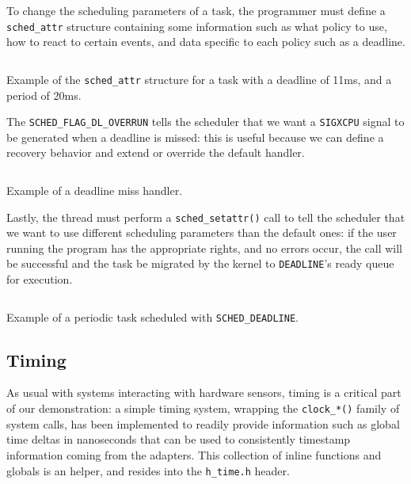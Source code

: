\documentclass[a4paper,12pt]{report}
\begin{document}
To change the scheduling parameters of a task, the programmer must define a \texttt{sched\_attr} structure containing some information such as what policy to use, how to react to certain events, and data specific to each policy such as a deadline.  

\begin{listing}[H]
\inputminted[frame=single,framesep=10pt]{c}{snippets/sched-attr.c}
\caption{Example of the \texttt{sched\_attr} structure for a task with a deadline of 11ms, and a period of 20ms.}
\end{listing}

The \texttt{SCHED\_FLAG\_DL\_OVERRUN} tells the scheduler that we want a \texttt{SIGXCPU} signal to be generated when a deadline is missed: this is useful because we can define a recovery behavior and extend or override the default handler.

\begin{listing}[H]
\inputminted[frame=single,framesep=10pt]{c}{snippets/dl-miss-handler.c}
\caption{Example of a deadline miss handler.}
\end{listing}

Lastly, the thread must perform a \texttt{sched\_setattr()} call to tell the scheduler that we want to use different scheduling parameters than the default ones: if the user running the program has the appropriate rights, and no errors occur, the call will be successful and the task be migrated by the kernel to \texttt{DEADLINE}'s ready queue for execution.

\begin{listing}[H]
\inputminted[frame=single,framesep=10pt]{c}{snippets/entry-point.c}
\caption{Example of a periodic task scheduled with \texttt{SCHED\_DEADLINE}.}
\end{listing}


\subsection{Timing}

As usual with systems interacting with hardware sensors, timing is a critical part of our demonstration: a simple timing system, wrapping the \texttt{clock\_*()} family of system calls, has been implemented to readily provide information such as global time deltas in nanoseconds that can be used to consistently timestamp information coming from the adapters. This collection of inline functions and globals is an helper, and resides into the \texttt{h\_time.h} header. 
\end{document}
